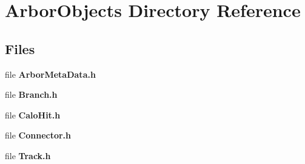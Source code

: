 \section{Arbor\+Objects Directory Reference}
\label{dir_d499ccc3dacad28bba9c1fad5ff642f9}
\subsection*{Files}
\begin{DoxyCompactItemize}
\item 
file {\bf Arbor\+Meta\+Data.\+h}
\item 
file {\bf Branch.\+h}
\item 
file {\bf Calo\+Hit.\+h}
\item 
file {\bf Connector.\+h}
\item 
file {\bf Track.\+h}
\end{DoxyCompactItemize}
